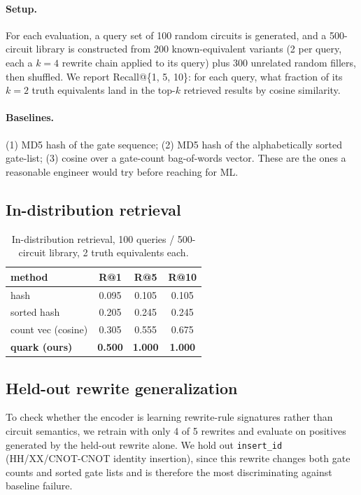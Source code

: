 \documentclass[11pt]{article}
\begin{document}
\paragraph{Setup.} For each evaluation, a query set of 100 random circuits is generated, and a 500-circuit library is constructed from 200 known-equivalent variants (2 per query, each a $k=4$ rewrite chain applied to its query) plus 300 unrelated random fillers, then shuffled. We report Recall@\{1, 5, 10\}: for each query, what fraction of its $k=2$ truth equivalents land in the top-$k$ retrieved results by cosine similarity.

\paragraph{Baselines.} (1) MD5 hash of the gate sequence; (2) MD5 hash of the alphabetically sorted gate-list; (3) cosine over a gate-count bag-of-words vector. These are the ones a reasonable engineer would try before reaching for ML.

\subsection{In-distribution retrieval}

\begin{table}[h]
\centering
\begin{tabular}{lccc}
\toprule
method & R@1 & R@5 & R@10 \\
\midrule
hash & 0.095 & 0.105 & 0.105 \\
sorted hash & 0.205 & 0.245 & 0.245 \\
count vec (cosine) & 0.305 & 0.555 & 0.675 \\
\textbf{quark (ours)} & \textbf{0.500} & \textbf{1.000} & \textbf{1.000} \\
\bottomrule
\end{tabular}
\caption{In-distribution retrieval, 100 queries / 500-circuit library, 2 truth equivalents each.}
\end{table}

\subsection{Held-out rewrite generalization}

To check whether the encoder is learning rewrite-rule signatures rather than circuit semantics, we retrain with only 4 of 5 rewrites and evaluate on positives generated by the held-out rewrite alone. We hold out \texttt{insert\_id} (HH/XX/CNOT-CNOT identity insertion), since this rewrite changes both gate counts and sorted gate lists and is therefore the most discriminating against baseline failure.
\end{document}
